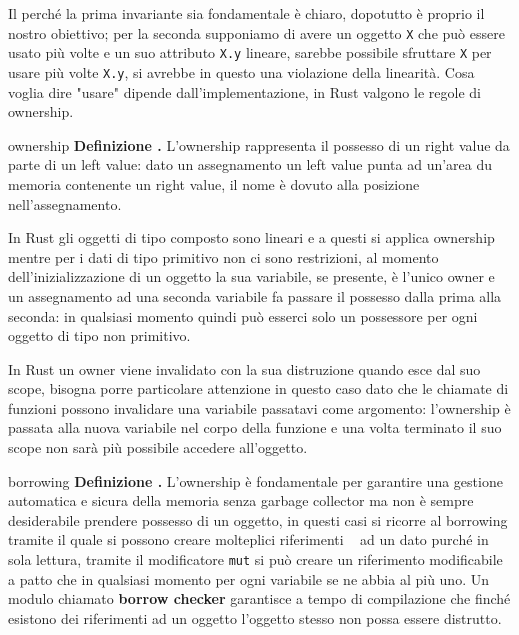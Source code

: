 \documentclass[Lau,binding=0.6cm]{sapthesis}
\newenvironment{myDefinition}[2]{ \begin{Definizione}[adjusted title=#1]{}{#2}
    \textbf{Definizione \thetcbcounter.} }{\end{Definizione}}
\newcommand{\textcode}[1]{\colorbox{backcolour}{\texttt{#1}}}
\begin{document}
Il perché la prima invariante sia fondamentale è chiaro, dopotutto è proprio il nostro obiettivo; per la seconda supponiamo di avere un oggetto \texttt{X} che può essere usato più volte e un suo attributo \texttt{X.y} lineare, sarebbe possibile sfruttare \texttt{X} per usare più volte \texttt{X.y}, si avrebbe in questo una violazione della linearità. 
Cosa voglia dire "usare" dipende dall'implementazione, in Rust valgono le regole di ownership.

\begin{myDefinition}{Ownership}{ownership}
    L'ownership rappresenta il possesso di un right value da parte di un left value: dato un assegnamento un left value punta ad un'area du memoria contenente un right value, il nome è dovuto alla posizione nell'assegnamento. 
    
    In Rust gli oggetti di tipo composto sono lineari e a questi si applica ownership mentre per i dati di tipo primitivo non ci sono restrizioni, al momento dell'inizializzazione di un oggetto la sua variabile, se presente, è l'unico owner e un assegnamento ad una seconda variabile fa passare il possesso dalla prima alla seconda: in qualsiasi momento quindi può esserci solo un possessore per ogni oggetto di tipo non primitivo. 

    In Rust un owner viene invalidato con la sua distruzione quando esce dal suo scope, bisogna porre particolare attenzione in questo caso dato che le chiamate di funzioni possono invalidare una variabile passatavi come argomento: l'ownership è passata alla nuova variabile nel corpo della funzione e una volta terminato il suo scope non sarà più possibile accedere all'oggetto. 

    
\end{myDefinition}

\begin{myDefinition}{Borrowing}{borrowing}
  L'ownership è fondamentale per garantire una gestione automatica e sicura della memoria senza garbage collector ma non è sempre desiderabile prendere possesso di un oggetto, in questi casi si ricorre al borrowing tramite il quale si possono creare molteplici  riferimenti ~\cite[4.2]{rust:language} ad un dato purché in sola lettura, tramite il modificatore \textcode{mut} si può creare un riferimento modificabile a patto che in qualsiasi momento per ogni variabile se ne abbia al più uno. 
  Un modulo chiamato \textbf{borrow checker} garantisce a tempo di compilazione che finché esistono dei riferimenti ad un oggetto l'oggetto stesso non possa essere distrutto. 

    
\end{myDefinition}
\end{document}
